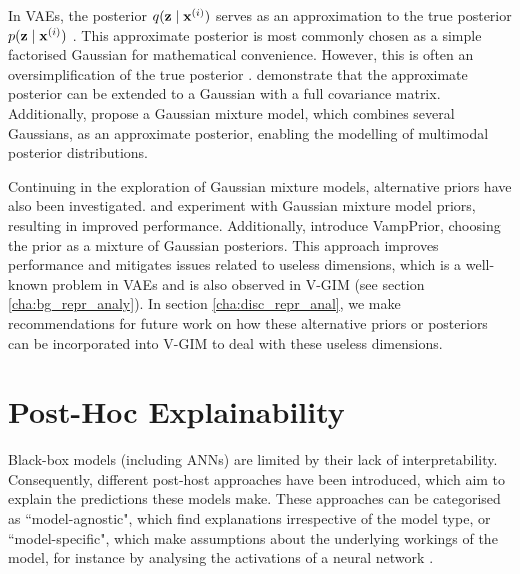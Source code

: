 	In VAEs, the posterior $q (\mathbf{z} \mid \mathbf{x}^{(i)})$ serves as an approximation to the true posterior $p (\mathbf{z} \mid \mathbf{x}^{(i)})$ \citep{odaiboTutorialDerivingStandard2019}. This approximate posterior is most commonly chosen as a simple factorised Gaussian for mathematical convenience. However, this is often an oversimplification of the true posterior \citep{nalisnickApproximateInferenceDeep2016}. \cite{kingmaIntroductionVariationalAutoencoders2019} demonstrate that the approximate posterior can be extended to a Gaussian with a full covariance matrix. Additionally, \cite{nalisnickApproximateInferenceDeep2016} propose a Gaussian mixture model, which combines several Gaussians, as an approximate posterior, enabling the modelling of multimodal posterior distributions.
	
	Continuing in the exploration of Gaussian mixture models, alternative priors have also been investigated. \cite{guoVariationalAutoencoderOptimizing2020} and \cite{leeMetaGMVAEMixtureGaussian2021} experiment with Gaussian mixture model priors, resulting in improved performance. Additionally, \cite{tomczakVAEVampPrior2018} introduce VampPrior, choosing the prior as a mixture of Gaussian posteriors. This approach improves performance and mitigates issues related to useless dimensions, which is a well-known problem in VAEs and is also observed in V-GIM (see section \ref{cha:bg_repr_analy}). In section \ref{cha:disc_repr_anal}, we make recommendations for future work on how these alternative priors or posteriors can be incorporated into V-GIM to deal with these useless dimensions.
	

\section{Post-Hoc Explainability}
Black-box models (including ANNs) are limited by their lack of interpretability. Consequently, different post-host approaches have been introduced, which aim to explain the predictions these models make. These approaches can be categorised as ``model-agnostic", which find explanations irrespective of the model type, or ``model-specific", which make assumptions about the underlying workings of the model, for instance by analysing the activations of a neural network \cite{barredoarrietaExplainableArtificialIntelligence2020a}.

